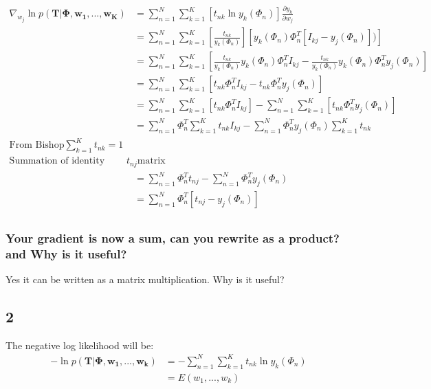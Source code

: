 \documentclass[a4paper]{article}
\begin{document}
\begin{align*}
    \nabla_{w_{j}} \ln{p(\pmb{T}|\pmb{\Phi}, \pmb{w_{1},...,w_{K}})} &=  \sum_{n=1}^{N}\sum_{k=1}^{K}\left [ t_{nk}\ln{y_{k}(\Phi_{n})} \right ] \frac{\partial y_{k}}{\partial w_{j}}\\
    &= \sum_{n=1}^{N}\sum_{k=1}^{K} \left[\frac{t_{nk}}{y_{k}(\Phi_{n})}\right]
    \left[y_{k}(\Phi_{n})\Phi^{T}_{n}[I_{kj} - y_{j}(\Phi_{n})])\right]\\
    &= \sum_{n=1}^{N}\sum_{k=1}^{K} \left[ \frac{t_{nk}}{y_{k}(\Phi_{n})}
    y_{k}(\Phi_{n})\Phi^{T}_{n}I_{kj} - 
    \frac{t_{nk}}{y_{k}(\Phi_{n})}
    y_{k}(\Phi_{n})\Phi^{T}_{n} y_{j}(\Phi_{n})\right]\\
    &= \sum_{n=1}^{N}\sum_{k=1}^{K} \left[t_{nk}
    \Phi^{T}_{n}I_{kj} - 
    t_{nk}\Phi^{T}_{n} y_{j}(\Phi_{n}) \right]\\
    &= \sum_{n=1}^{N}\sum_{k=1}^{K} \left[t_{nk}
    \Phi^{T}_{n}I_{kj} \right] - \sum_{n=1}^{N}\sum_{k=1}^{K} \left[t_{nk}\Phi^{T}_{n} y_{j}(\Phi_{n}) \right]\\
    &= \sum_{n=1}^{N}\Phi^{T}_{n}\sum_{k=1}^{K} t_{nk}
    I_{kj}  - \sum_{n=1}^{N}\Phi^{T}_{n}y_{j}(\Phi_{n}) \sum_{k=1}^{K} t_{nk} \\
    \text{From Bishop} \sum_{k=1}^{K} t_{nk} = 1\\
    \text{Summation of identity matrix times t is another } t_{nj} \text{matrix} \\
    &= \sum_{n=1}^{N}\Phi^{T}_{n}t_{nj}  - \sum_{n=1}^{N}\Phi^{T}_{n}y_{j}(\Phi_{n}) \\
    &= \sum_{n=1}^{N}\Phi^{T}_{n} \left [t_{nj}  - y_{j}(\Phi_{n}) \right] \\
\end{align*}{}


\subsubsection*{Your gradient is now a sum, can you rewrite as a product? and Why is it useful?}
Yes it can be written as a matrix multiplication. 
Why is it useful?

\subsection*{2}
The negative log likelihood will be:
\begin{align*}
    -\ln{p(\pmb{T}|\pmb{\Phi, w_{1},...,w_{k}})} &= 
    -\sum_{n=1}^{N}\sum_{k=1}^{K}t_{nk}\ln{y_{k}(\Phi_{n})} \\
    &= E(w_{1},...,w_{k})
\end{align*}{}
\end{document}
